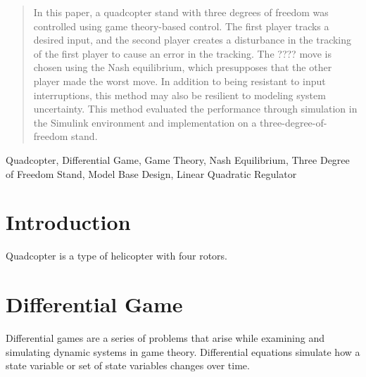 \documentclass[conference]{IEEEtran}
\begin{document}
\begin{abstract}
    In this paper, a quadcopter stand with three degrees of freedom was controlled using game theory-based control. The first player tracks a desired input, and the second player creates a disturbance in the tracking of the first player to cause an error in the tracking. The ???? move is chosen using the Nash equilibrium, which presupposes that the other player made the worst move. In addition to being resistant to input interruptions, this method may also be resilient to modeling system uncertainty. This method evaluated the performance through simulation in the Simulink environment and implementation on a three-degree-of-freedom stand.
\end{abstract}

\begin{IEEEkeywords}
    Quadcopter, Differential Game, Game Theory, Nash Equilibrium, Three Degree of Freedom Stand, Model Base Design, Linear Quadratic Regulator
\end{IEEEkeywords}

\section{Introduction}
Quadcopter is a type of helicopter with four rotors. %


\section{Differential Game}
Differential games are a series of problems that arise while examining and simulating dynamic systems in game theory.
Differential equations
 simulate how a state variable or set of state variables changes over time.
\end{document}
